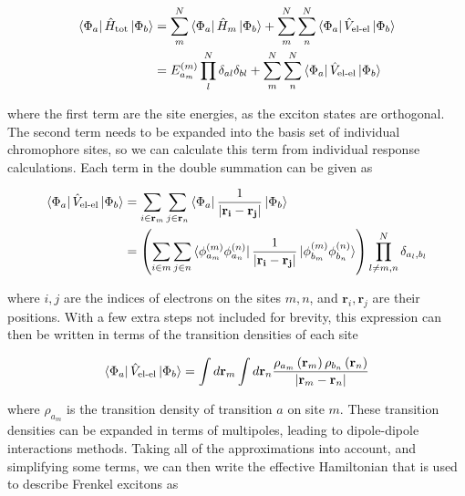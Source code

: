 \begin{equation}
\begin{aligned}
\bra{\Phi_a} \hat{H}_{\text{tot}}\ket{\Phi_b} &= \sum^N_m \bra{\Phi_a} \hat{H}_{m}\ket{\Phi_b} + \sum^N_m \sum^N_n \bra{\Phi_a} \hat{V}_{\text{el-el}}\ket{\Phi_b} \\
&= E^{\left(m\right)}_{a_m} \prod^N_l \delta_{al} \delta_{bl} + \sum^N_m \sum^N_n \bra{\Phi_a} \hat{V}_{\text{el-el}}\ket{\Phi_b}
\end{aligned}
\end{equation}

where the first term are the site energies, as the exciton states are orthogonal. 
The second term needs to be expanded into the basis set of individual chromophore 
sites, so we can calculate this term from individual response calculations. Each 
term in the double summation can be given as

\begin{equation}
\begin{aligned}
\bra{\Phi_a} \hat{V}_{\text{el-el}}\ket{\Phi_b} &= \sum_{i \in \mathbf{r}_m} \sum_{j \in \mathbf{r}_n} \bra{\Phi_a} \frac{1}{\left|\mathbf{r_i} - \mathbf{r_j}\right|} \ket{\Phi_b} \\
&= \left(\sum_{i \in m} \sum_{j \in n} \bra{\phi^{\left(m\right)}_{a_m} \phi^{\left(n\right)}_{a_n}} \frac{1}{\left|\mathbf{r_i} - \mathbf{r_j}\right|} \ket{\phi^{\left(m\right)}_{b_m}\phi^{\left(n\right)}_{b_n}}\right)\prod^N_{l\neq m,n}\delta_{a_l, b_l}
\end{aligned}
\end{equation}

where $i,j$ are the indices of electrons on the sites $m,n$, and $\mathbf{r}_i, 
\mathbf{r}_j$ are their positions. With a few extra steps not included for brevity,
this expression can then be written in terms of the transition densities of each 
site\cite{Scholes2003}

\begin{equation}
\bra{\Phi_a} \hat{V}_{\text{el-el}}\ket{\Phi_b} = \int d\mathbf{r}_{m} \int d\mathbf{r}_{n} \frac{\rho_{a_m}\left(\mathbf{r}_{m}\right)\rho_{b_n}\left(\mathbf{r}_{n}\right)}{\left|\mathbf{r}_{m} - \mathbf{r}_{n}\right|}
\end{equation}

where $\rho_{a_m}$ is the transition density of transition $a$ on site $m$. These 
transition densities can be expanded in terms of multipoles, leading to dipole-dipole 
interactions methods. Taking all of the approximations into account, and simplifying 
some terms, we can then write the effective Hamiltonian that is used to describe 
Frenkel excitons as

